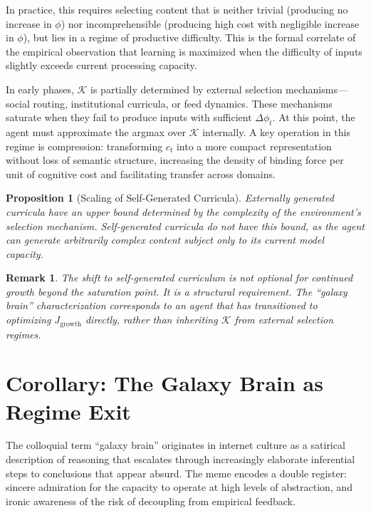 \documentclass[12pt]{article}
\newtheorem{proposition}{Proposition}[section]
\newtheorem{remark}{Remark}[section]
\newcommand{\bind}{\phi}
\newcommand{\Jgrowth}{J_{\mathrm{growth}}}
\begin{document}
In practice, this requires selecting content that is neither trivial
(producing no increase in $\bind$) nor incomprehensible (producing high
cost with negligible increase in $\bind$), but lies in a regime of
productive difficulty. This is the formal correlate of the empirical
observation that learning is maximized when the difficulty of inputs
slightly exceeds current processing capacity.

In early phases, $\mathcal{K}$ is partially determined by external
selection mechanisms---social routing, institutional curricula, or feed
dynamics. These mechanisms saturate when they fail to produce inputs
with sufficient $\Delta \bind_t$. At this point, the agent must
approximate the argmax over $\mathcal{K}$ internally. A key operation in
this regime is compression: transforming $c_t$ into a more compact
representation without loss of semantic structure, increasing the density
of binding force per unit of cognitive cost and facilitating transfer
across domains.

\begin{proposition}[Scaling of Self-Generated Curricula]
\label{prop:scaling}
Externally generated curricula have an upper bound determined by the
complexity of the environment's selection mechanism. Self-generated
curricula do not have this bound, as the agent can generate arbitrarily
complex content subject only to its current model capacity.
\end{proposition}

\begin{remark}
The shift to self-generated curriculum is not optional for continued
growth beyond the saturation point. It is a structural requirement. The
``galaxy brain'' characterization corresponds to an agent that has
transitioned to optimizing $\Jgrowth$ directly, rather than inheriting
$\mathcal{K}$ from external selection regimes.
\end{remark}

\section{Corollary: The Galaxy Brain as Regime Exit}
\label{sec:galaxybrain}

The colloquial term ``galaxy brain'' originates in internet culture as a
satirical description of reasoning that escalates through increasingly
elaborate inferential steps to conclusions that appear absurd. The meme
encodes a double register: sincere admiration for the capacity to operate
at high levels of abstraction, and ironic awareness of the risk of
decoupling from empirical feedback.
\end{document}
